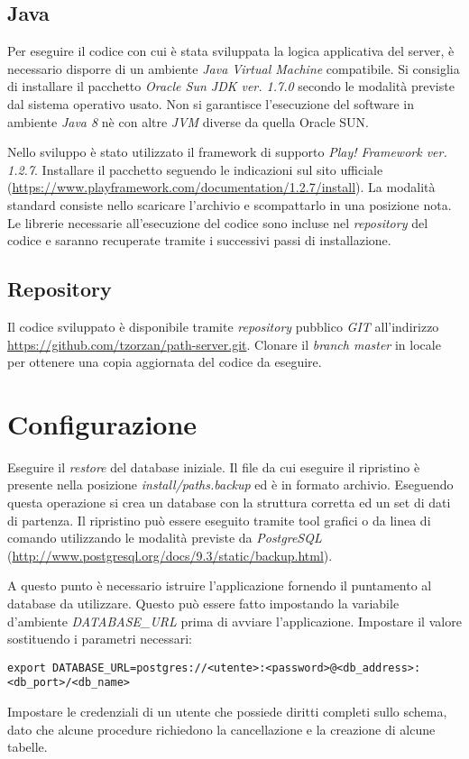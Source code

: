 \subsection{Java}
Per eseguire il codice con cui è stata sviluppata la logica applicativa del server, è necessario disporre di un ambiente \emph{Java Virtual Machine} compatibile. Si consiglia di installare il pacchetto \emph{Oracle Sun JDK ver. 1.7.0} secondo le modalità previste dal sistema operativo usato. Non si garantisce l'esecuzione del software in ambiente \emph{Java 8} nè con altre \emph{JVM} diverse da quella Oracle SUN.

Nello sviluppo è stato utilizzato il framework di supporto \emph{Play! Framework ver. 1.2.7}. Installare il pacchetto seguendo le indicazioni sul sito ufficiale (\url{https://www.playframework.com/documentation/1.2.7/install}). La modalità standard consiste nello scaricare l'archivio e scompattarlo in una posizione nota.
Le librerie necessarie all'esecuzione del codice sono incluse nel \emph{repository} del codice e saranno recuperate tramite i successivi passi di installazione.

\subsection{Repository}
Il codice sviluppato è disponibile tramite \emph{repository} pubblico \emph{GIT} all'indirizzo \url{https://github.com/tzorzan/path-server.git}. Clonare il \emph{branch master} in locale per ottenere una copia aggiornata del codice da eseguire.

\section{Configurazione}
Eseguire il \emph{restore} del database iniziale. Il file da cui eseguire il ripristino è presente nella posizione \emph{install/paths.backup} ed è in formato archivio. Eseguendo questa operazione si crea un database con la struttura corretta ed un set di dati di partenza. Il ripristino può essere eseguito tramite tool grafici o da linea di comando utilizzando le modalità previste da \emph{PostgreSQL} (\url{http://www.postgresql.org/docs/9.3/static/backup.html}).

A questo punto è necessario istruire l'applicazione fornendo il puntamento al database da utilizzare. Questo può essere fatto impostando la variabile d'ambiente \emph{DATABASE\_URL} prima di avviare l'applicazione. Impostare il valore sostituendo i parametri necessari:
\begin{verbatim}
export DATABASE_URL=postgres://<utente>:<password>@<db_address>:<db_port>/<db_name>
\end{verbatim}
Impostare le credenziali di un utente che possiede diritti completi sullo schema, dato che alcune procedure richiedono la cancellazione e la creazione di alcune tabelle.

